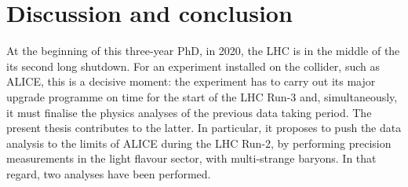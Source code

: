 \chapter{Discussion and conclusion}
\label{chap:Conclusion}

At the beginning of this three-year PhD, in 2020, the LHC is in the middle of the its second long shutdown. For an experiment installed on the collider, such as ALICE, this is a decisive moment: the experiment has to carry out its major upgrade programme on time for the start of the LHC Run-3 and, simultaneously, it must finalise the physics analyses of the previous data taking period. The present thesis contributes to the latter. In particular, it proposes to push the data analysis to the limits of ALICE during the LHC Run-2, by performing precision measurements in the light flavour sector, with multi-strange baryons. In that regard, two analyses have been performed.\\


